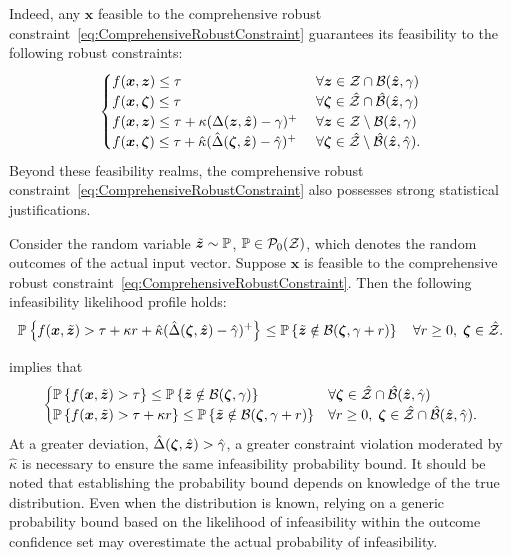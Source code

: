 \documentclass[opre, nonblindrev]{informswp}
\newcommand{\1}[1]{\mathds{1}{\left(#1\right)}}
\begin{document}
Indeed, any $\bm x$ feasible to the comprehensive robust constraint~\eqref{eq:ComprehensiveRobustConstraint} guarantees its feasibility to the following robust constraints:
$$
\begin{cases}
f(\bm x, \bm z) \leq \tau &~\forall \bm z \in \mathcal{Z} \cap \mathcal{B}(\hat{\bm{z}}, \gamma) \\
f(\bm x, \bm \zeta) \leq \tau &~\forall \bm \zeta \in \hat {\mathcal{Z}} \cap \hat {\mathcal{B}}(\hat{\bm{z}}, \gamma) \\
f(\bm x,\bm z) \leq \tau +  \kappa (\Delta(\bm z,\hat{\bm{z}}) - \gamma)^+ &~\forall \bm z \in \mathcal{Z} \setminus  \mathcal{B}(\hat{\bm{z}}, \gamma) \\
f(\bm x,\bm \zeta) \leq \tau +  \hat \kappa (\hat \Delta(\bm \zeta,\hat{\bm{z}}) - \hat \gamma)^+ &~\forall  \bm\zeta \in \hat {\mathcal{Z}} \setminus \hat {\mathcal{B}}(\hat{\bm{z}}, \hat \gamma). 
\end{cases}
$$
Beyond these feasibility realms, the comprehensive robust constraint~\eqref{eq:ComprehensiveRobustConstraint} also possesses strong statistical justifications.

\begin{theorem}
\label{thm:StatisticalJustification}
Consider the random variable $\tilde{\bm{z}}\sim \mathbb{P}$, $\mathbb{P} \in \mathcal{P}_0(\mathcal{Z})$, which denotes the random outcomes of the actual input vector. Suppose $\bm x$ is feasible to the comprehensive robust constraint~\eqref{eq:ComprehensiveRobustConstraint}. Then the following infeasibility likelihood profile holds:
$$
\mathbb{P}\left\{f(\bm x,\tilde{\bm{z}}) > \tau + \kappa r  + \hat \kappa (\hat \Delta(\bm \zeta,\hat{\bm{z}}) - \hat \gamma)^+ \right\} \leq  \mathbb{P}\left\{\tilde{\bm{z}} \notin \mathcal{B}(\bm \zeta,\gamma+r)\right\} ~~~\forall r \geq 0, \; \bm \zeta \in \hat {\mathcal{Z}}.
$$
\end{theorem}

 implies that 
$$
\begin{cases}
\mathbb{P}\left\{f(\bm x,\tilde{\bm{z}}) > \tau \right\} \leq   \mathbb{P}\left\{\tilde{\bm{z}} \notin \mathcal{B}(\bm \zeta,\gamma)\right\} & \forall \bm \zeta \in\hat {\mathcal{Z}} \cap \hat {\mathcal{B}}(\hat{\bm{z}}, \hat \gamma) \\
\mathbb{P}\left\{f(\bm x,\tilde{\bm{z}}) > \tau + \kappa r \right\} \leq  \mathbb{P}\left\{\tilde{\bm{z}} \notin \mathcal{B}(\bm \zeta,\gamma+r)\right\} & \forall r \geq 0, \; \bm \zeta \in\hat {\mathcal{Z}} \cap \hat {\mathcal{B}}(\hat{\bm{z}}, \hat \gamma).
\end{cases}
$$
At a greater deviation, $\hat \Delta(\bm \zeta,\hat{\bm{z}})>\hat \gamma$, a greater constraint violation moderated by $\hat \kappa$ is necessary to ensure the same infeasibility probability bound. It should be noted that establishing the probability bound depends on knowledge of the true distribution. Even when the distribution is known, relying on a generic probability bound based on the likelihood of infeasibility within the outcome confidence set may overestimate the actual probability of infeasibility. 
\end{document}

